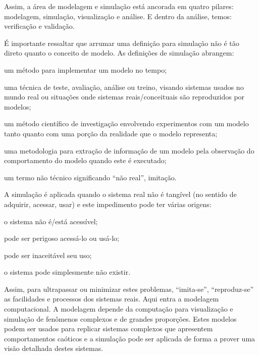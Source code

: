 \documentclass[a4paper,12pt,oneside,onecolumn]{uerj}
\begin{document}
Assim, a área de modelagem e simulação está ancorada em quatro pilares: modelagem, simulação, visualização e análise. E dentro da análise, temos: verificação e validação.

É importante ressaltar que arrumar uma definição para simulação não é tão direto quanto o conceito de modelo. As definições de simulação abrangem:

\begin{lcircp}
    \item um método para implementar um modelo no tempo;
    \item uma técnica de teste, avaliação, análise ou treino, visando sistemas usados no mundo real ou situações onde sistemas reais/conceituais são reproduzidos por modelos;
    \item um método científico de investigação envolvendo experimentos com um modelo tanto quanto com uma porção da realidade que o modelo representa;
    \item uma metodologia para extração de informação de um modelo pela observação do comportamento do modelo quando este é executado;
    \item um termo não técnico significando ``não real'', imitação.\\
\end{lcircp}

A simulação é aplicada quando o sistema real não é tangível (no sentido de adquirir, acessar, usar) e este impedimento pode ter várias origens:

\begin{lcircp}
    \item o sistema não é/está acessível;
    \item pode ser perigoso acessá-lo ou usá-lo;
    \item pode ser inaceitável seu uso;
    \item o sistema pode simplesmente não existir.\\
\end{lcircp}

Assim, para ultrapassar ou minimizar estes problemas, ``imita-se'', ``reproduz-se'' as facilidades e processos dos sistemas reais. Aqui entra a modelagem computacional. A modelagem depende da computação para visualização e simulação de fenômenos complexos e de grandes proporções. Estes modelos podem ser usados para replicar sistemas complexos que apresentem comportamentos caóticos e a simulação pode ser aplicada de forma a prover uma visão detalhada destes sistemas.
\end{document}
